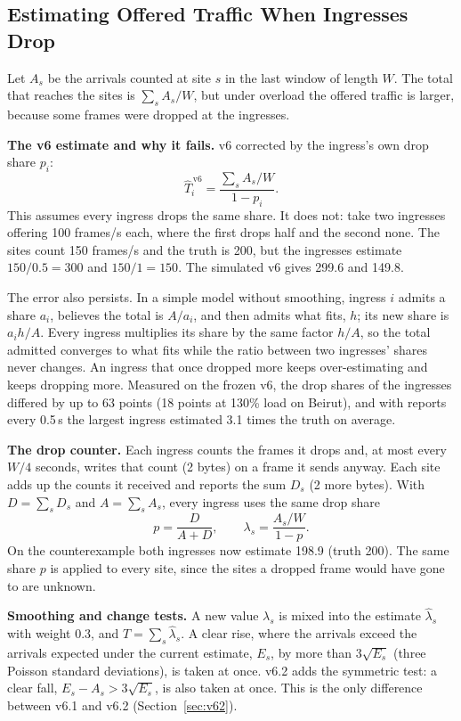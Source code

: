 \documentclass[conference]{IEEEtran}
\newcommand{\That}{\hat{T}}
\begin{document}
\subsection{Estimating Offered Traffic When Ingresses Drop}\label{sec:est}
Let $A_s$ be the arrivals counted at site $s$ in the last window of length $W$. The total that reaches the sites is $\sum_s A_s/W$, but under overload the offered traffic is larger, because some frames were dropped at the ingresses.

\textbf{The v6 estimate and why it fails.} v6 corrected by the ingress's own drop share $p_i$:
\begin{equation}
\That^{\,\mathrm{v6}}_i = \frac{\sum_s A_s/W}{1-p_i}.
\label{eq:v6}
\end{equation}
This assumes every ingress drops the same share. It does not: take two ingresses offering 100 frames/s each, where the first drops half and the second none. The sites count 150 frames/s and the truth is 200, but the ingresses estimate $150/0.5 = 300$ and $150/1 = 150$. The simulated v6 gives 299.6 and 149.8.

The error also persists. In a simple model without smoothing, ingress $i$ admits a share $a_i$, believes the total is $A/a_i$, and then admits what fits, $h$; its new share is $a_i h/A$. Every ingress multiplies its share by the same factor $h/A$, so the total admitted converges to what fits while the ratio between two ingresses' shares never changes. An ingress that once dropped more keeps over-estimating and keeps dropping more. Measured on the frozen v6, the drop shares of the ingresses differed by up to 63 points (18 points at 130\% load on Beirut), and with reports every 0.5\,s the largest ingress estimated 3.1 times the truth on average.

\textbf{The drop counter.} Each ingress counts the frames it drops and, at most every $W/4$ seconds, writes that count (2 bytes) on a frame it sends anyway. Each site adds up the counts it received and reports the sum $D_s$ (2 more bytes). With $D = \sum_s D_s$ and $A = \sum_s A_s$, every ingress uses the same drop share
\begin{equation}
p = \frac{D}{A+D}, \qquad \lambda_s = \frac{A_s/W}{1-p} .
\label{eq:est}
\end{equation}
On the counterexample both ingresses now estimate 198.9 (truth 200). The same share $p$ is applied to every site, since the sites a dropped frame would have gone to are unknown.

\textbf{Smoothing and change tests.} A new value $\lambda_s$ is mixed into the estimate $\hat\lambda_s$ with weight 0.3, and $\That = \sum_s \hat\lambda_s$. A clear rise, where the arrivals exceed the arrivals expected under the current estimate, $E_s$, by more than $3\sqrt{E_s}$ (three Poisson standard deviations), is taken at once. v6.2 adds the symmetric test: a clear fall, $E_s - A_s > 3\sqrt{E_s}$, is also taken at once. This is the only difference between v6.1 and v6.2 (Section~\ref{sec:v62}).
\end{document}
